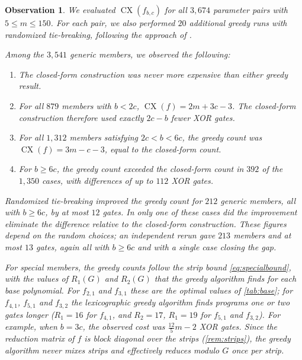 \documentclass{ieeeaccess}
\theoremstyle{plain}
\newtheorem{observation}[theorem]{Observation}
\theoremstyle{definition}
\newcommand{\CX}{\operatorname{CX}}
\begin{document}
\begin{observation}\label{obs:greedy}
We evaluated $\CX(f_{b,c})$ for all $3,674$ parameter pairs with $5\le
m\le150$. For each pair, we also performed $20$ additional greedy runs with
randomized tie-breaking, following the approach of \cite{TanPeyrin2020}.

Among the $3,541$ generic members, we observed the following:
\begin{enumerate}[label=(\alph*),itemsep=1pt]
  \item The closed-form construction was
  never more expensive than either greedy result.

  \item For all $879$ members with $b<2c$,
  $\CX(f)=2m+3c-3$. The closed-form construction therefore used exactly $2c-b$
  fewer XOR gates.

  \item For all $1,312$ members satisfying
  $2c<b<6c$, the greedy count was $\CX(f)=3m-c-3$, equal to the closed-form
  count.

  \item For $b\ge6c$, the greedy count
  exceeded the closed-form count in $392$ of the $1,350$ cases, with
  differences of up to $112$ XOR gates.
\end{enumerate}

Randomized tie-breaking improved the greedy count for $212$ generic members, all
with $b\ge6c$, by at most $12$ gates. In only one of these cases did the
improvement eliminate the difference relative to the closed-form construction.
These figures depend on the random choices; an independent rerun gave $213$
members and at most $13$ gates, again all with $b\ge6c$ and with a single case
closing the gap.

For special members, the greedy counts follow the strip bound
\eqref{eq:specialbound}, with the values of $R_1(G)$ and $R_2(G)$ that the
greedy algorithm finds for each base polynomial. For $f_{2,1}$ and $f_{3,1}$ these are the
optimal values of \cref{tab:base}; for $f_{4,1}$, $f_{5,1}$ and $f_{3,2}$ the
lexicographic greedy algorithm finds programs one or two gates longer
($R_1=16$ for $f_{4,1}$, and $R_2=17$, $R_1=19$ for $f_{5,1}$ and $f_{3,2}$). For example, when
$b=3c$, the observed cost was $\tfrac{12}{5}m-2$ XOR gates. Since the reduction matrix of
$f$ is block diagonal over the strips (\cref{rem:strips}), the greedy algorithm
never mixes strips and effectively reduces modulo $G$ once per strip.
\end{observation}
\end{document}
